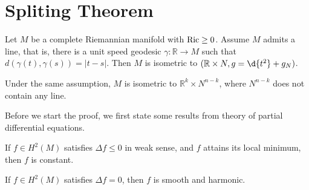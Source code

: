 \section{Spliting Theorem}

\begin{thm}
    Let $M$ be a complete Riemannian manifold with $\operatorname{Ric}\geq 0$.
    Assume $M$ admits a line, that is, there is a unit speed geodesic $\gamma:\mathbb{R}\to M$ such that $d(\gamma(t),\gamma(s))=|t-s|$.
    Then $M$ is isometric to $(\mathbb{R}\times N,g=\d{t^2}+g_N)$.
\end{thm}

\begin{cor}
    Under the same assumption, $M$ is isometric to $\mathbb{R}^k\times N^{n-k}$, where $N^{n-k}$ does not contain any line.
\end{cor}

Before we start the proof, we first state some results from theory of partial differential equations.
\begin{thm}
    If $f\in H^2(M)$ satisfies $\Delta f\leq 0$ in weak sense, and $f$ attains its local minimum, then $f$ is constant.
\end{thm}

\begin{thm}
    If $f\in H^2(M)$ satisfies $\Delta f=0$, then $f$ is smooth and harmonic.
\end{thm}

